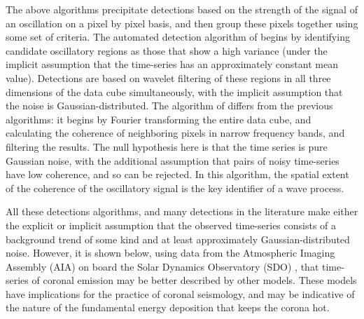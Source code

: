 \documentclass[onecolumn]{emulateapj}
\begin{document}
The above algorithms precipitate detections based on the strength of
the signal of an oscillation on a pixel by pixel basis, and then group
these pixels together using some set of criteria.  The automated
detection algorithm of \cite{2008SoPh..248..395S} begins by
identifying candidate oscillatory regions as those that show a high
variance \citep{2003SoPh..213..103G} (under the implicit assumption
that the time-series has an approximately constant mean value).
Detections are based on wavelet filtering of these regions in all
three dimensions of the data cube simultaneously, with the implicit
assumption that the noise is Gaussian-distributed.  The algorithm of
\cite{2008SoPh..252..321M} differs from the previous algorithms: it
begins by Fourier transforming the entire data cube, and calculating
the coherence of neighboring pixels in narrow frequency bands, and
filtering the results. The null hypothesis here is that the time
series is pure Gaussian noise, with the additional assumption that
pairs of noisy time-series have low coherence, and so can be rejected.
In this algorithm, the spatial extent of the coherence of the
oscillatory signal is the key identifier of a wave process.

All these detections algorithms, and many detections in the literature
make either the explicit or implicit assumption that the observed
time-series consists of a background trend of some kind and at least
approximately Gaussian-distributed noise.  However, it is shown below,
using data from the Atmospheric Imaging Assembly (AIA)
\cite{2012SoPh..275...17L} on board the Solar Dynamics Observatory
(SDO) \cite{2012SoPh..275....3P}, that time-series of coronal emission
may be better described by other models.  These models have
implications for the practice of coronal seismology, and may be
indicative of the nature of the fundamental energy deposition that
keeps the corona hot.
\end{document}
